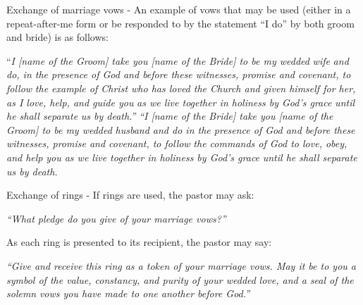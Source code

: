 \begin{outerlst}[left=0pt,labelsep=0pt]
\begin{innerlst}[resume*]
      \item Exchange of marriage vows - An example of vows that may be used (either in a repeat-after-me form or be responded to by the statement ``I do'' by both groom and bride) is as follows: 
\end{innerlst}
{``}\textit{I [name of the Groom] take you [name of the Bride] to be my wedded}\textit{ wife}\textit{ and do, in the presence of God and before these witnesses}\textit{, promise and covenant, to follow}\textit{ the example of Christ who has loved the Church and given himself for her, as I love, help}\textit{, and guide you}\textit{ as we live together in holiness by God's grace}\textit{ until he shall separate}\textit{ us by death}\textit{.'' }  \textit{{``I [name of the Bride] take you [name of the Groom] to be my wedded}}\textit{ husband and do in the presence of God and before these witnesses}\textit{, promise and covenant, to follow}\textit{ the commands of God to love, obey, and help}\textit{ you as we live together in holiness by God's grace}\textit{ until he shall separate}\textit{ us by death}\textit{.}   

\begin{innerlst}[resume*]
      \item Exchange of rings - If rings are used, the pastor may ask: 
\end{innerlst}
\textit{{``What pledge do}}\textit{ you give of your marriage vows}\textit{?''}  

\begin{innerlst}[resume*]
      \item As each ring is presented to its recipient, the pastor may say: 
\end{innerlst}
\textit{{``Give and receive this ring as a token of your marriage vows}}\textit{. May it be to you a symbol of the value, constancy, and purity of your wedded}\textit{ love, and a seal of the solemn}\textit{ vows you have made to one another before God.''}   


\end{outerlst}
